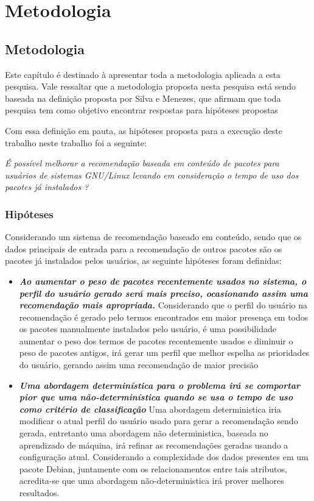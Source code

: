 \part{Metodologia}

\chapter[Metodologia]{Metodologia}

Este capítulo é destinado à apresentar toda a metodologia aplicada a esta
pesquisa. Vale ressaltar que a metodologia proposta nesta pesquisa está sendo
baseada na definição proposta por Silva e Menezes, que afirmam que toda pesquisa
tem como objetivo encontrar respostas para hipóteses propostas
\cite{da2005metodologia}

Com essa definição em pauta, as hipóteses proposta para a execução deste trabalho neste trabalho foi a seguinte:

\begin{center}
\textit{É possível melhorar a recomendação baseada em conteúdo de pacotes para usuários de sistemas GNU/Linux levando em consideração o tempo de uso dos pacotes já instalados ?}
\end{center}

\section{Hipóteses}

Considerando um sistema de recomendação baseado em conteúdo, sendo que os dados principais de entrada para a recomendação de outros pacotes são os pacotes já instalados pelos usuários, as seguinte hipóteses foram definidas:

\begin{itemize}
    \item \textit{\textbf{Ao aumentar o peso de pacotes recentemente usados no sistema, o perfil do usuário gerado será mais preciso, ocasionando assim uma recomendação mais apropriada.}} Considerando que o perfil do usuário na recomendação é gerado pelo termos encontrados em maior presença em todos os pacotes manualmente instalados pelo usuário, é uma possibilidade aumentar o peso dos termos de pacotes recentemente usados e diminuir o peso de pacotes antigos, irá gerar um perfil que melhor espelha as prioridades do usuário, gerando assim uma recomendação de maior precisão
    \item \textit{\textbf{Uma abordagem determinística para o problema irá se comportar pior que uma não-determinística quando se usa o tempo de uso como critério de classificação}} Uma abordagem deterministica iria modificar o atual perfil do usuário usado para gerar a recomendação sendo gerada, entretanto uma abordagem não deterministica, baseada no aprendizado de máquina, irá refinar as recomendações geradas usando a configuração atual. Considerando a complexidade dos dados presentes em um pacote Debian, juntamente com os relacionamentos entre tais atributos, acredita-se que uma abordagem não-deterministica irá prover melhores resultados. 
\end{itemize}

